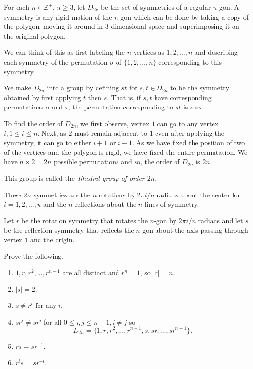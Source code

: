 For each $n\in\mathbb{Z}^+$, $n\geq 3$, let $D_{2n}$ be the set of symmetries of a regular $n$-gon. A symmetry is any rigid motion of the $n$-gon which can be done by taking a copy of the polygon, moving it around in $3$-dimensional space and superimposing it on the original polygon.

We can think of this as first labeling the $n$ vertices as $1,2,\ldots,n$ and describing each symmetry of the permutation $\sigma$ of $\{1,2,\ldots,n\}$ corresponding to this symmetry.

We make $D_{2n}$ into a group by defining $st$ for $s,t\in D_{2n}$ to be the symmetry obtained by first applying $t$ then $s$. That is, if $s,t$ have corresponding permutations $\sigma$ and $\tau$, the permutation corresponding to $st$ is $\sigma\circ\tau$.

\vspace{2mm}
To find the order of $D_{2n}$, we first observe, vertex $1$ can go to any vertex $i, 1\leq i\leq n$. Next, as $2$ must remain adjacent to $1$ even after applying the symmetry, it can go to either $i+1$ or $i-1$. As we have fixed the position of two of the vertices and the polygon is rigid, we have fixed the entire permutation. We have $n\times 2=2n$ possible permutations and so, the order of $D_{2n}$ is $2n$.

\vspace{2mm}
This group is called the \textit{dihedral group of order $2n$}.

These $2n$ symmetries are the $n$ rotations by $2\pi i/n$ radians about the center for $i=1,2,\ldots,n$ and the $n$ reflections about the $n$ lines of symmetry.

\vspace{2mm}
Let $r$ be the rotation symmetry that rotates the $n$-gon by $2\pi i/n$ radians and let $s$ be the reflection symmetry that reflects the $n$-gon about the axis passing through vertex $1$ and the origin.

\begin{exercise}
    Prove the following.
    \begin{enumerate}
        \item $1,r,r^2,\ldots,r^{n-1}$ are all distinct and $r^n=1$, so $|r|=n$.
        \item $|s|=2$.
        \item $s\neq r^i$ for any $i$.
        \item $sr^i\neq sr^j$ for all $0\leq i,j\leq n-1, i\neq j$ so 
        $$D_{2n}=\{1,r,r^2,\ldots,r^{n-1},s,sr,\ldots,sr^{n-1}\}.$$
        \item $rs=sr^{-1}$.
        \item $r^is=sr^{-i}$.
    \end{enumerate}
\end{exercise}

